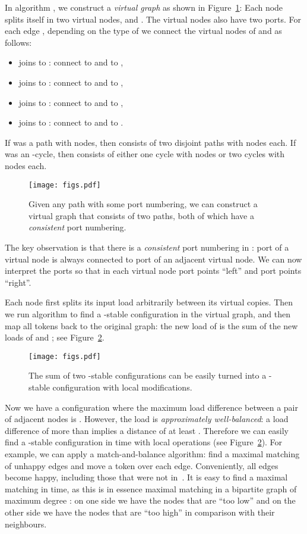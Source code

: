 In algorithm , we construct a \emph{virtual graph}  as shown in Figure~\ref{fig:virtpath}: Each node  splits itself in two virtual nodes,  and . The virtual nodes also have two ports. For each edge , depending on the type of  we connect the virtual nodes of  and  as follows:
\begin{itemize}[noitemsep]
    \item  joins  to : connect  to  and  to ,
    \item  joins  to : connect  to  and  to ,
    \item  joins  to : connect  to  and  to ,
    \item  joins  to : connect  to  and  to .
\end{itemize}
If  was a path with  nodes, then  consists of two disjoint paths with  nodes each. If  was an -cycle, then  consists of either one cycle with  nodes or two cycles with  nodes each.

\begin{figure}[ht]
    \centering
    \texttt{[image: figs.pdf]}
    \caption{Given any path  with some port numbering, we can construct a virtual graph  that consists of two paths, both of which have a \emph{consistent} port numbering.}\label{fig:virtpath}
\end{figure}

The key observation is that there is a \emph{consistent} port numbering in : port  of a virtual node is always connected to port  of an adjacent virtual node. We can now interpret the ports so that in each virtual node port  points ``left'' and port  points ``right''.

Each node first splits its input load arbitrarily between its virtual copies. Then we run algorithm  to find a -stable configuration in the virtual graph, and then map all tokens back to the original graph: the new load of  is the sum of the new loads of  and ; see Figure~\ref{fig:pathfix}.

\begin{figure}[ht]
    \centering
    \texttt{[image: figs.pdf]}
    \caption{The sum of two -stable configurations can be easily turned into a -stable configuration with local modifications.}\label{fig:pathfix}
\end{figure}

Now we have a configuration where the maximum load difference between a pair of adjacent nodes is . However, the load is \emph{approximately well-balanced}: a load difference of more than  implies a distance of at least . Therefore we can easily find a -stable configuration in  time with local operations (see Figure~\ref{fig:pathfix}). For example, we can apply a match-and-balance algorithm: find a maximal matching  of unhappy edges and move a token over each edge. Conveniently, all edges become happy, including those that were not in~. It is easy to find a maximal matching  in  time, as this is in essence maximal matching in a bipartite graph of maximum degree : on one side we have the nodes that are ``too low'' and on the other side we have the nodes that are ``too high'' in comparison with their neighbours.

